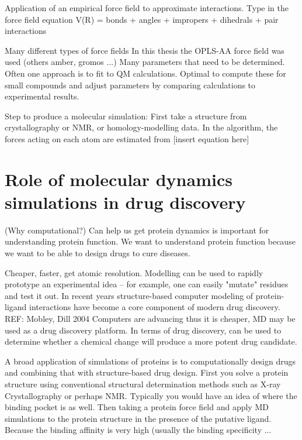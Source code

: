 
\2 Application of an empirical force field to approximate interactions.
    \3 Type in the force field equation V(R) = bonds + angles + impropers + dihedrals + pair interactions

\1 Many different types of force fields
\1 In this thesis the OPLS-AA force field was used (others amber, gromos ...)
Many parameters that need to be determined. Often one approach is to fit to QM calculations.  Optimal to compute these for small compounds and adjust parameters by comparing calculations to experimental results.

\1 Step to produce a molecular simulation: 
\2 First take a structure from crystallography or NMR, or homology-modelling data.
\2 In the algorithm, the forces acting on each atom are estimated from [insert equation here]

\section{Role of molecular dynamics simulations in drug discovery}
\1 (Why computational?) Can help us get protein dynamics is important for understanding protein function. We want to understand protein function because we want to be able to design drugs to cure diseases.

\1 Cheaper, faster, get atomic resolution. Modelling can be used to rapidly prototype an experimental idea -- for example, one can easily "mutate" residues and test it out. In recent years structure-based computer modeling of protein-ligand interactions have become a core component of modern drug discovery. REF: Mobley, Dill 2004 Computers are advancing thus it is cheaper, MD may be used as a drug discovery platform. In terms of drug discovery, can be used to determine whether a chemical change will produce a more potent drug candidate.

\1 A broad application of simulations of proteins is to computationally design drugs and combining that with structure-based drug design.
  \2 First you solve a protein structure using conventional structural determination methods such as X-ray Crystallography or perhaps NMR.  Typically you would have an idea of where the binding pocket is as well. 
  \2 Then taking a protein force field and apply MD simulations to the protein structure in the presence of the putative ligand.  Because the binding affinity is very high (usually the binding specificity ...



